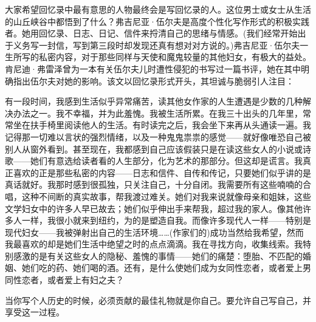 大家希望回忆录中最有意思的人物最终会是写回忆录的人。这位男士或女士从生活的山丘峡谷中都悟到了什么？弗吉尼亚·伍尔夫是高度个性化写作形式的积极实践者。她用回忆录、日志、日记、信件来捋清自己的思绪与情感。(我们经常开始出于义务写一封信，写到第三段时却发现还真有想对对方说的。)弗吉尼亚·伍尔夫一生所写的私密内容，对于那些同样与天使和魔鬼较量的其他妇女，有极大的益处。肯尼迪·弗雷泽曾为一本有关伍尔夫儿时遭性侵犯的书写过一篇书评，她在其中明确指出伍尔夫对她的影响。该文以回忆录形式开头，其坦诚与脆弱引人注目：

有一段时间，我感到生活似乎异常痛苦，读其他女作家的人生遭遇是少数的几种解决办法之一。我不幸福，并为此羞愧。我被生活所累。在我三十出头的几年里，常常坐在扶手椅里阅读他人的生活。有时读完之后，我会坐下来再从头通读一遍。我记得那一切难以言状的强烈情绪，以及一种鬼鬼祟祟的感觉——就好像唯恐自己被别人从窗外看到。甚至现在，我都感到自己应该假装只是在读这些女人的小说或诗歌——她们有意选给读者看的人生部分，化为艺术的那部分。但这却是谎言。我真正喜欢的正是那些私密的内容——日志和信件、自传和传记，只要她们似乎讲的是真话就好。我那时感到很孤独，只关注自己，十分自闭。我需要所有这些喃喃的合唱，这种不间断的真实故事，帮我渡过难关。她们对我来说就像母亲和姐妹，这些文学妇女中的许多人早已故去；她们似乎伸出手来帮我，超过我的家人。像其他许多人一样，我很小就来到纽约，为的是塑造自我。而像许多现代人一样——特别是现代妇女——我被弹射出自己的生活环境……(作家们的)成功当然给我希望，然而我最喜欢的却是她们生活中绝望之时的点点滴滴。我在寻找方向，收集线索。我特别感激的是有关这些女人的隐秘、羞愧的事情——她们的痛楚：堕胎、不匹配的婚姻、她们吃的药、她们喝的酒。还有，是什么使她们成为女同性恋者，或者爱上男同性恋者，或者爱上有妇之夫？

当你写个人历史的时候，必须贡献的最佳礼物就是你自己。要允许自己写自己，并享受这一过程。